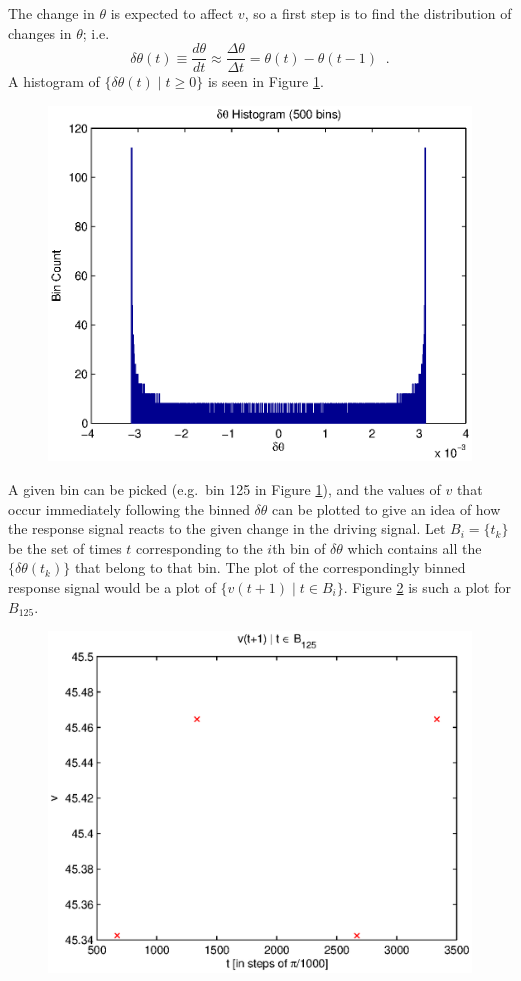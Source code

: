 \documentclass[a4paper,11pt]{article}
\begin{document}
The change in $\theta$ is expected to affect $v$, so a first step is to find the distribution of changes in $\theta$; i.e.\
$$
\delta\theta(t) \equiv \frac{d\theta}{dt} \approx \frac{\Delta\theta}{\Delta t} = \theta(t)-\theta(t-1)\;\;.
$$
A histogram of $\{\delta\theta(t)\;|\;t\ge 0\}$ is seen in Figure \ref{fig:dthetahist}.
\begin{figure}[ht]
\includegraphics[scale=0.65]{dthetahist.eps}
\caption{}
\label{fig:dthetahist}
\end{figure}
A given bin can be picked (e.g.\ bin 125 in Figure \ref{fig:dthetahist}), and the values of $v$ that occur immediately following the binned $\delta\theta$ can be plotted to give an idea of how the response signal reacts to the given change in the driving signal.  Let $B_i = \{t_k\}$ be the set of times $t$ corresponding to the $i$th bin of $\delta\theta$ which contains all the $\{\delta\theta(t_k)\}$ that belong to that bin.  The plot of the correspondingly binned response signal would be a plot of $\{v(t+1)\;|\; t\in B_i\}$.  Figure \ref{fig:vbin125} is such a plot for $B_{125}$.
\begin{figure}[ht]
\includegraphics[scale=0.65]{vbin125.eps}
\caption{}
\label{fig:vbin125}
\end{figure}
\end{document}
